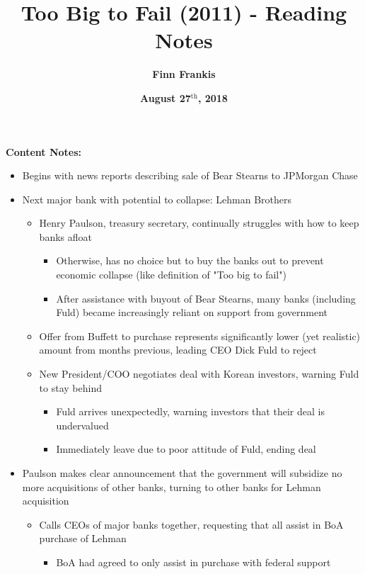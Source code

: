 \documentclass{article}
\title{\textbf{Too Big to Fail (2011) - Reading Notes}}
\date{\textbf{August 27$^\text{th}$, 2018}}
\author{\textbf{Finn Frankis}}
\begin{document}
    \maketitle
    \textbf{Content Notes: }
    \begin{itemize}
        \item Begins with news reports describing sale of Bear Stearns to JPMorgan Chase
        \item Next major bank with potential to collapse: Lehman Brothers
        \begin{itemize}
            \item Henry Paulson, treasury secretary, continually struggles with how to keep banks afloat
            \begin{itemize}
                \item Otherwise, has no choice but to buy the banks out to prevent economic collapse (like definition of "Too big to fail")
                \item After assistance with buyout of Bear Stearns, many banks (including Fuld) became increasingly reliant on support from government
            \end{itemize}
            \item Offer from Buffett to purchase represents significantly lower (yet realistic) amount from months previous, leading CEO Dick Fuld to reject
            \item New President/COO negotiates deal with Korean investors, warning Fuld to stay behind
            \begin{itemize}
                \item Fuld arrives unexpectedly, warning investors that their deal is undervalued
                \item Immediately leave due to poor attitude of Fuld, ending deal
            \end{itemize}
        \end{itemize}
        \item Paulson makes clear announcement that the government will subsidize no more acquisitions of other banks, turning to other banks for Lehman acquisition
        \begin{itemize}
            \item Calls CEOs of major banks together, requesting that all assist in BoA purchase of Lehman 
            \begin{itemize}
                \item BoA had agreed to only assist in purchase with federal support 

\end{itemize}
\end{itemize}
\end{itemize}
\end{document}
